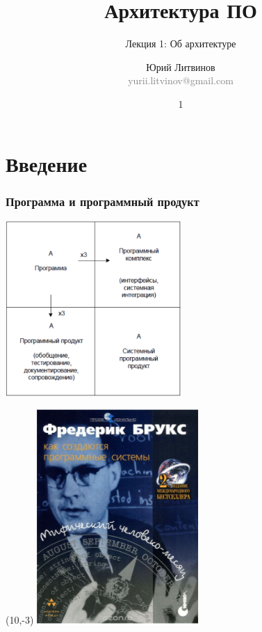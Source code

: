 \documentclass[xetex,mathserif,serif]{beamer}
\title{Архитектура ПО}
\subtitle{Лекция 1: Об архитектуре}
\author[Юрий Литвинов]{Юрий Литвинов\\\small{\textcolor{gray}{yurii.litvinov@gmail.com}}}
\date{1}
\begin{document}
	\frame{\titlepage}

	\section{Введение}

	\begin{frame}
		\frametitle{Программа и программный продукт}
		\begin{center}
			\includegraphics[width=0.5\textwidth]{brooksSquare.png}
		\end{center}
		\begin{textblock}{2}(10,-3)
			\includegraphics[width=\textwidth]{brooksCover.png}
		\end{textblock}
	\end{frame}
\end{document}

